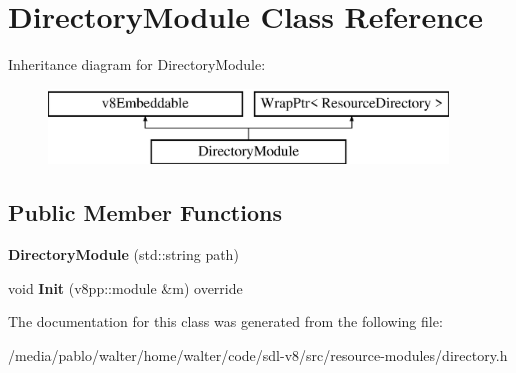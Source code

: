 \hypertarget{classDirectoryModule}{}\section{Directory\+Module Class Reference}
\label{classDirectoryModule}
Inheritance diagram for Directory\+Module\+:\begin{figure}[H]
\begin{center}
\leavevmode
\includegraphics[height=2.000000cm]{classDirectoryModule}
\end{center}
\end{figure}
\subsection*{Public Member Functions}
\begin{DoxyCompactItemize}
\item 
\mbox{\label{classDirectoryModule_ad7eea22549a0b8c0c8d59db419f8f237}} 
{\bfseries Directory\+Module} (std\+::string path)
\item 
\mbox{\label{classDirectoryModule_a6ef18aabab37f769f049e16d132987df}} 
void {\bfseries Init} (v8pp\+::module \&m) override
\end{DoxyCompactItemize}


The documentation for this class was generated from the following file\+:\begin{DoxyCompactItemize}
\item 
/media/pablo/walter/home/walter/code/sdl-\/v8/src/resource-\/modules/directory.\+h\end{DoxyCompactItemize}
